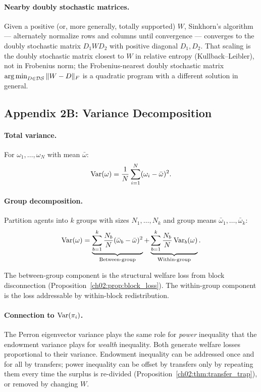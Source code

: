 \documentclass[../structural_economics_book.tex]{subfiles}
\begin{document}
\paragraph{Nearby doubly stochastic matrices.} Given a positive (or, more generally, totally supported) $W$, Sinkhorn's algorithm --- alternately normalize rows and columns until convergence --- converges to the doubly stochastic matrix $D_1 W D_2$ with positive diagonal $D_1, D_2$. That scaling is the doubly stochastic matrix closest to $W$ in relative entropy (Kullback--Leibler), not in Frobenius norm; the Frobenius-nearest doubly stochastic matrix $\operatorname*{arg\,min}_{D \in \mathcal{DS}} \|W - D\|_F$ is a quadratic program with a different solution in general.


\subsection*{Appendix 2B: Variance Decomposition}
\label{ch02:app:variance}

\paragraph{Total variance.} For $\omega_1, \ldots, \omega_N$ with mean $\bar{\omega}$:
\begin{equation}
\operatorname{Var}(\omega) = \frac{1}{N}\sum_{i=1}^N (\omega_i - \bar{\omega})^2.
\end{equation}

\paragraph{Group decomposition.} Partition agents into $k$ groups with sizes $N_1, \ldots, N_k$ and group means $\bar{\omega}_1, \ldots, \bar{\omega}_k$:
\begin{equation}
\operatorname{Var}(\omega) = \underbrace{\sum_{b=1}^k \frac{N_b}{N}(\bar{\omega}_b - \bar{\omega})^2}_{\text{Between-group}} + \underbrace{\sum_{b=1}^k \frac{N_b}{N}\operatorname{Var}_b(\omega)}_{\text{Within-group}}.
\end{equation}

The between-group component is the structural welfare loss from block disconnection (Proposition~\ref{ch02:prop:block_loss}). The within-group component is the loss addressable by within-block redistribution.

\paragraph{Connection to $\operatorname{Var}(\pi_i)$.} The Perron eigenvector variance plays the same role for \textit{power} inequality that the endowment variance plays for \textit{wealth} inequality. Both generate welfare losses proportional to their variance. Endowment inequality can be addressed once and for all by transfers; power inequality can be offset by transfers only by repeating them every time the surplus is re-divided (Proposition~\ref{ch02:thm:transfer_trap}), or removed by changing $W$.
\end{document}
